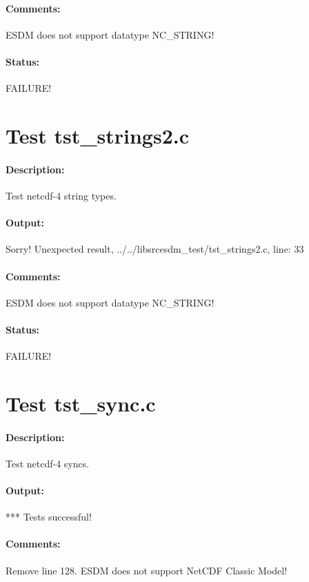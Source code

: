\paragraph{Comments:} ESDM does not support datatype NC\_STRING!

\paragraph{Status:} FAILURE!

\section{Test tst\_strings2.c}

\paragraph{Description:} Test netcdf-4 string types.

\paragraph{Output:} Sorry! Unexpected result, ../../libsrcesdm\_test/tst\_strings2.c, line: 33

\paragraph{Comments:} ESDM does not support datatype NC\_STRING!

\paragraph{Status:} FAILURE!

\section{Test tst\_sync.c}

\paragraph{Description:} Test netcdf-4 syncs.

\paragraph{Output:} *** Tests successful!

\paragraph{Comments:} Remove line 128. ESDM does not support NetCDF Classic Model!


